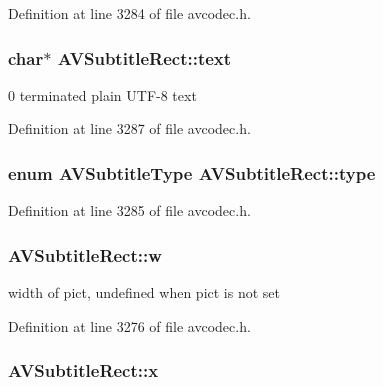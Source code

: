 Definition at line 3284 of file avcodec.\+h.

\subsubsection[{\texorpdfstring{text}{text}}]{\setlength{\rightskip}{0pt plus 5cm}char$\ast$ A\+V\+Subtitle\+Rect\+::text}\hypertarget{struct_a_v_subtitle_rect_a893b1c87ee3d1816a0149ab3005fdd9e}{}\label{struct_a_v_subtitle_rect_a893b1c87ee3d1816a0149ab3005fdd9e}


0 terminated plain U\+T\+F-\/8 text 



Definition at line 3287 of file avcodec.\+h.

\subsubsection[{\texorpdfstring{type}{type}}]{\setlength{\rightskip}{0pt plus 5cm}enum {\bf A\+V\+Subtitle\+Type} A\+V\+Subtitle\+Rect\+::type}\hypertarget{struct_a_v_subtitle_rect_ad3cd08b87cdc6c7e8f0e7567d60598f2}{}\label{struct_a_v_subtitle_rect_ad3cd08b87cdc6c7e8f0e7567d60598f2}


Definition at line 3285 of file avcodec.\+h.

\subsubsection[{\texorpdfstring{w}{w}}]{ A\+V\+Subtitle\+Rect\+::w}\hypertarget{struct_a_v_subtitle_rect_a264a52200e34e138d47c76d7a431125a}{}\label{struct_a_v_subtitle_rect_a264a52200e34e138d47c76d7a431125a}


width of pict, undefined when pict is not set 



Definition at line 3276 of file avcodec.\+h.

\subsubsection[{\texorpdfstring{x}{x}}]{ A\+V\+Subtitle\+Rect\+::x}\hypertarget{struct_a_v_subtitle_rect_a0059c986f1ee3aab45c0f62f0709621b}{}\label{struct_a_v_subtitle_rect_a0059c986f1ee3aab45c0f62f0709621b}


